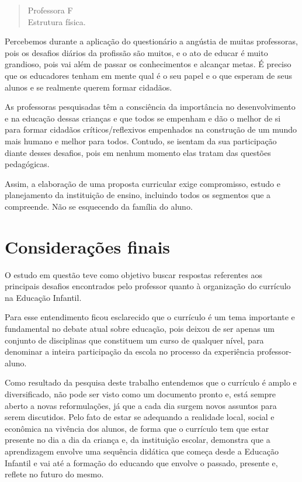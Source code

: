 \begin{refsection}
\begin{quotation}
        \negpar[-1.5em]{}Professora F\quad{}\\Estrutura física. 
    \end{quotation}

    Percebemos durante a aplicação do questionário a angústia de muitas professoras, pois os desafios diários da profissão são muitos, e o ato de educar é muito grandioso, pois vai além de passar os conhecimentos e alcançar metas. É preciso que os educadores tenham em mente qual é o seu papel e o que esperam de seus alunos e se realmente querem formar cidadãos.  

    As professoras pesquisadas têm a consciência da importância no desenvolvimento e na educação dessas crianças e que todos se empenham e dão o melhor de si para formar cidadãos críticos/reflexivos empenhados na construção de um mundo mais humano e melhor para todos. Contudo, se isentam da sua participação diante desses desafios, pois em nenhum momento elas tratam das questões pedagógicas.  

    Assim, a elaboração de uma proposta curricular exige compromisso, estudo e planejamento da instituição de ensino, incluindo todos os segmentos que a compreende. Não se esquecendo da família do aluno.


    \section{Considerações finais}

    O estudo em questão teve como objetivo buscar respostas referentes aos principais desafios encontrados pelo professor quanto à organização do currículo na Educação Infantil. 

    Para esse entendimento ficou esclarecido que o currículo é um tema importante e fundamental no debate atual sobre educação, pois deixou de ser apenas um conjunto de disciplinas que constituem um curso de qualquer nível, para denominar a inteira participação da escola no processo da experiência professor-aluno.  

    Como resultado da pesquisa deste trabalho entendemos que o currículo é amplo e diversificado, não pode ser visto como um documento pronto e, está sempre aberto a novas reformulações, já que a cada dia surgem novos assuntos para serem discutidos. Pelo fato de estar se adequando a realidade local, social e econômica na vivência dos alunos, de forma que o currículo tem que estar presente no dia a dia da criança e, da instituição escolar, demonstra que a aprendizagem envolve uma sequência didática que começa desde a Educação Infantil e vai até a formação do educando que envolve o passado, presente e, reflete no futuro do mesmo.  


\end{refsection}
